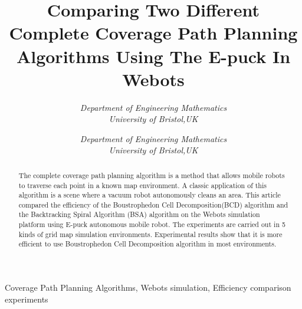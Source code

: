 \documentclass[conference]{IEEEtran}
\begin{document}
\title{Comparing Two Different Complete Coverage Path Planning Algorithms Using The E-puck In Webots}

\author{
  \textit{Department of Engineering Mathematics}\\
  \textit{University of Bristol,UK}
  \and
  \textit{Department of Engineering Mathematics}\\
  \textit{University of Bristol,UK}
}

\maketitle

\begin{abstract}

The complete coverage path planning algorithm is a method that allows mobile robots to traverse each point in a known map environment. A classic application of this algorithm is a scene where a vacuum robot autonomously cleans an area. This article compared the efficiency of the Boustrophedon  Cell  Decomposition(BCD) algorithm and the Backtracking Spiral Algorithm (BSA) algorithm on the Webots simulation platform using E-puck autonomous mobile robot. The experiments are carried out in 5 kinds of grid map simulation environments. Experimental results show that it is more efficient to use Boustrophedon Cell Decomposition algorithm in most environments.

\end{abstract}

\def\IEEEkeywordsname{Keywords} 
\begin{IEEEkeywords} Coverage  Path  Planning Algorithms, Webots simulation, Efficiency comparison experiments 
\end{IEEEkeywords} 
\end{document}
